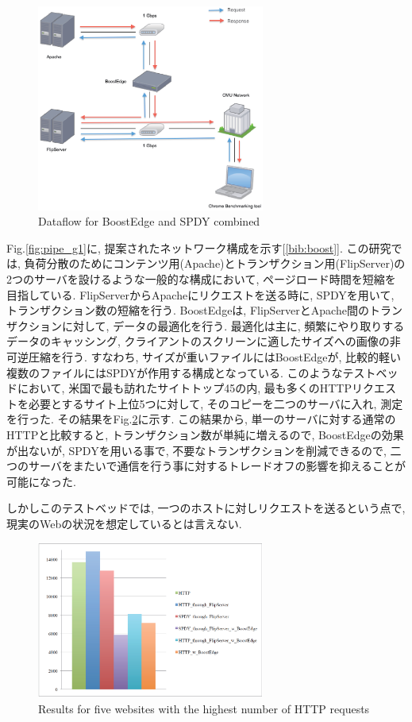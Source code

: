 \documentclass[twocolumn]{jsarticle}
\begin{document}
\begin{figure}[h]
  \centering
  \includegraphics[width=7.5cm]{eps/BoostEdge_dia.eps}
  \caption{Dataflow for BoostEdge and SPDY combined}
  \label{fig:ongoing1}
\end{figure}

Fig.\ref{fig:pipe_g1}に, 提案されたネットワーク構成を示す[\ref{bib:boost}].
この研究では, 負荷分散のためにコンテンツ用(Apache)とトランザクション用(FlipServer)の2つのサーバを設けるような一般的な構成において,
ページロード時間を短縮を目指している.
FlipServerからApacheにリクエストを送る時に, SPDYを用いて, トランザクション数の短縮を行う.
BoostEdgeは, FlipServerとApache間のトランザクションに対して, データの最適化を行う.
最適化は主に, 頻繁にやり取りするデータのキャッシング, クライアントのスクリーンに適したサイズへの画像の非可逆圧縮を行う.
すなわち, サイズが重いファイルにはBoostEdgeが, 比較的軽い複数のファイルにはSPDYが作用する構成となっている.
このようなテストベッドにおいて, 米国で最も訪れたサイトトップ45の内, 最も多くのHTTPリクエストを必要とするサイト上位5つに対して,
そのコピーを二つのサーバに入れ, 測定を行った.
その結果をFig.\ref{fig:ongoing12}に示す.
この結果から, 単一のサーバに対する通常のHTTPと比較すると, トランザクション数が単純に増えるので, BoostEdgeの効果が出ないが,
SPDYを用いる事で, 不要なトランザクションを削減できるので, 二つのサーバをまたいで通信を行う事に対するトレードオフの影響を抑えることが可能になった.

しかしこのテストベッドでは, 一つのホストに対しリクエストを送るという点で, 現実のWebの状況を想定しているとは言えない.

\begin{figure}[h]
  \centering
  \includegraphics[width=7.5cm]{eps/BoostEdge_graph.eps}
  \caption{Results for five websites with the highest number of HTTP requests}
  \label{fig:ongoing12}
\end{figure}
\end{document}
